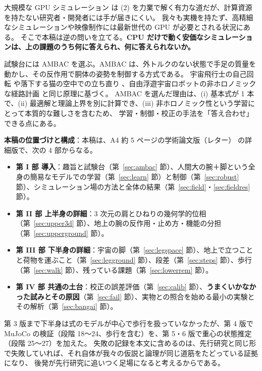 \documentclass[paper=a4paper,fontsize=10pt,twocolumn,column_gap=2zw,line_length=24zw,number_of_lines=46,head_space=20mm]{jlreq}
\begin{document}
大規模な GPU シミュレーション \cite{makoviychuk2021} は (2) を力業で解く有力な道だが、計算資源を持たない研究者・開発者には手が届きにくい。
我々も実機を持たず、高精細なシミュレーションや映像制作には最新世代の GPU が必要とされる状況にある。
そこで本稿は逆の問いを立てる。\textbf{CPU だけで動く安価なシミュレーションは、上の課題のうち何に答えられ、何に答えられないか。}

試験台には AMBAC を選ぶ。AMBAC は、外トルクのない状態で手足の質量を動かし、その反作用で胴体の姿勢を制御する方式である。
宇宙飛行士の自己回転 \cite{kane1970} や落下する猫の空中での立ち直り \cite{kane1969,montgomery1993}、自由浮遊宇宙ロボットの非ホロノミックな経路計画 \cite{nakamura1991} と同じ原理に基づく。
AMBAC を選んだ理由は、(i) 基本式が 1 本で、(ii) 最適解と理論上界を別に計算でき、(iii) 非ホロノミック性という学習にとって本質的な難しさを含むため、
学習・制御・校正の手法を「答え合わせ」できる点にある。

\textbf{本稿の位置づけと構成}：本稿は、A4 約 5 ページの学術論文版（レター）\cite{letter2026} の詳細版で、次の 4 部からなる。
\begin{itemize}\setlength{\itemsep}{0pt}
\item \textbf{第 I 部 導入}：趣旨と試験台（第~\ref{sec:ambac} 節）、人間大の腕＋脚という全身の簡易なモデルでの学習（第~\ref{sec:learn} 節）と制御（第~\ref{sec:robust} 節）、シミュレーション場の方法と全体の結果（第~\ref{sec:field}・\ref{sec:fieldres} 節）。
\item \textbf{第 II 部 上半身の詳細}：3 次元の肩とひねりの幾何学的位相（第~\ref{sec:upper3d} 節）、地上の腕の反作用・止め方・機能の分担（第~\ref{sec:upperground} 節）。
\item \textbf{第 III 部 下半身の詳細}：宇宙の脚（第~\ref{sec:legspace} 節）、地上で立つことと荷物を運ぶこと（第~\ref{sec:legground} 節）、段差（第~\ref{sec:steps} 節）、歩行（第~\ref{sec:walk} 節）、残っている課題（第~\ref{sec:lowerrem} 節）。
\item \textbf{第 IV 部 共通の土台}：校正の誤差評価（第~\ref{sec:calib} 節）、\textbf{うまくいかなかった試みとその原因}（第~\ref{sec:fail} 節）、実物との照合を始める最小の実験とその解析（第~\ref{sec:bangai} 節）。
\end{itemize}
第 3 版まで下半身は式のモデルが中心で歩行を扱っていなかったが、第 4 版で MuJoCo の検証（段階 18〜24、歩行を含む）を、第 5・6 版で重心の状態推定（段階 25〜27）を加えた。
失敗の記録を本文に含めるのは、先行研究と同じ形で失敗していれば、それ自体が我々の仮説と論理が同じ道筋をたどっている証拠になり、
後発が先行研究に追いつく足場になると考えるからである。
\end{document}
